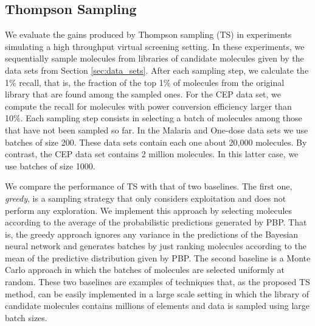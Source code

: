 \subsection{Thompson Sampling}

We evaluate the gains produced by Thompson sampling (TS) in experiments simulating a high throughput virtual screening setting. In these experiments, we sequentially sample molecules from libraries of candidate molecules given by the data sets from Section \ref{sec:data_sets}. After each sampling step, we calculate the 1\% recall, that is, the fraction of the top 1\% of molecules from the original library that are found among the sampled ones. 
For the CEP data set, we compute the recall for molecules with power conversion efficiency larger than 10\%.
Each sampling step consists in selecting a batch of molecules among those that have not been sampled so far. In the Malaria and One-dose data sets we use batches of size 200. These data sets contain each one about 20,000 molecules. By contrast, the CEP data set contains 2 million molecules. In this latter case, we use batches of size 1000. 

We compare the performance of TS with that of two baselines. The first one, \emph{greedy}, is a sampling strategy that only considers exploitation and does not perform any exploration. We implement this approach by selecting molecules according to the average of the probabilistic predictions generated by PBP. That is, the greedy approach ignores any variance in the predictions of the Bayesian neural network and generates batches by just ranking molecules according to the mean of the predictive distribution given by PBP. The second baseline is a Monte Carlo approach in which the batches of molecules are selected uniformly at random. These two baselines are examples of techniques that, as the proposed TS method, can be easily implemented in a large scale setting in which the library of candidate molecules contains millions of elements and data is sampled using large batch sizes.

